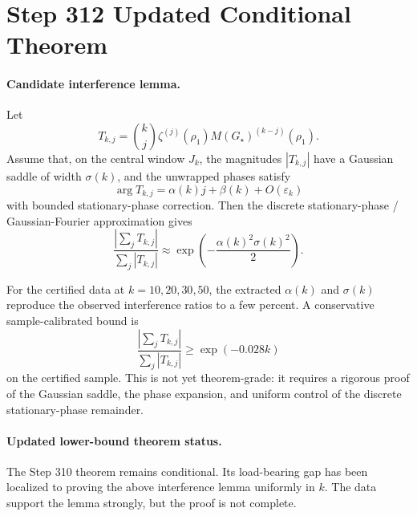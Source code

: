 \section*{Step 312 Updated Conditional Theorem}

\paragraph{Candidate interference lemma.}
Let
\[
T_{k,j}={k\choose j}\zeta^{(j)}(\rho_1)M(G_\star)^{(k-j)}(\rho_1).
\]
Assume that, on the central window \(J_k\), the magnitudes
\(|T_{k,j}|\) have a Gaussian saddle of width \(\sigma(k)\), and the
unwrapped phases satisfy
\[
\arg T_{k,j}=\alpha(k)j+\beta(k)+O(\varepsilon_k)
\]
with bounded stationary-phase correction.  Then the discrete
stationary-phase / Gaussian-Fourier approximation gives
\[
\frac{\left|\sum_jT_{k,j}\right|}{\sum_j|T_{k,j}|}
\approx
\exp\!\left(-\frac{\alpha(k)^2\sigma(k)^2}{2}\right).
\]

For the certified data at \(k=10,20,30,50\), the extracted
\(\alpha(k)\) and \(\sigma(k)\) reproduce the observed interference
ratios to a few percent.  A conservative sample-calibrated bound is
\[
\frac{\left|\sum_jT_{k,j}\right|}{\sum_j|T_{k,j}|}
\ge \exp(-0.028 k)
\]
on the certified sample.  This is not yet theorem-grade: it requires a
rigorous proof of the Gaussian saddle, the phase expansion, and uniform
control of the discrete stationary-phase remainder.

\paragraph{Updated lower-bound theorem status.}
The Step 310 theorem remains conditional.  Its load-bearing gap has been
localized to proving the above interference lemma uniformly in \(k\).
The data support the lemma strongly, but the proof is not complete.
